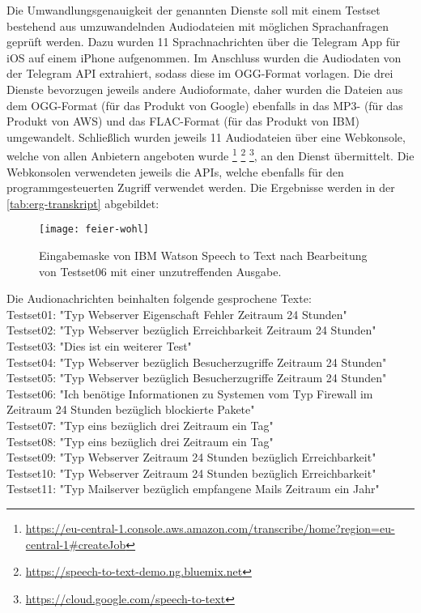 Die Umwandlungsgenauigkeit der genannten Dienste soll mit einem Testset bestehend aus umzuwandelnden Audiodateien mit möglichen Sprachanfragen geprüft werden. Dazu wurden 11 Sprachnachrichten über die Telegram App für iOS auf einem iPhone aufgenommen. Im Anschluss wurden die Audiodaten von der Telegram API extrahiert, sodass diese im OGG-Format vorlagen. Die drei Dienste bevorzugen jeweils andere Audioformate, daher wurden die Dateien aus dem OGG-Format (für das Produkt von Google) ebenfalls in das MP3- (für das Produkt von AWS) und das FLAC-Format (für das Produkt von IBM) umgewandelt. Schließlich wurden jeweils 11 Audiodateien über eine Webkonsole, welche von allen Anbietern angeboten wurde \footnote{\url{https://eu-central-1.console.aws.amazon.com/transcribe/home?region=eu-central-1\#createJob}} \footnote{\url{https://speech-to-text-demo.ng.bluemix.net}} \footnote{\url{https://cloud.google.com/speech-to-text}}, an den Dienst übermittelt. Die Webkonsolen verwendeten jeweils die APIs, welche ebenfalls für den programmgesteuerten Zugriff verwendet werden. Die Ergebnisse werden in der \autoref{tab:erg-transkript} abgebildet:

\begin{figure}[h!]
\centering
\texttt{[image: feier-wohl]}
\caption{Eingabemaske von IBM Watson Speech to Text nach Bearbeitung von Testset06 mit einer unzutreffenden Ausgabe.}
\label{fig:feier-wohl}
\end{figure}

Die Audionachrichten beinhalten folgende gesprochene Texte: \\
Testset01: "Typ Webserver Eigenschaft Fehler Zeitraum 24 Stunden" \\
Testset02: "Typ Webserver bezüglich Erreichbarkeit Zeitraum 24 Stunden" \\
Testset03: "Dies ist ein weiterer Test" \\
Testset04: "Typ Webserver bezüglich Besucherzugriffe Zeitraum 24 Stunden" \\
Testset05: "Typ Webserver bezüglich Besucherzugriffe Zeitraum 24 Stunden" \\
Testset06: "Ich benötige Informationen zu Systemen vom Typ Firewall im Zeitraum 24 Stunden bezüglich blockierte Pakete" \\
Testset07: "Typ eins bezüglich drei Zeitraum ein Tag" \\
Testset08: "Typ eins bezüglich drei Zeitraum ein Tag" \\
Testset09: "Typ Webserver Zeitraum 24 Stunden bezüglich Erreichbarkeit" \\
Testset10: "Typ Webserver Zeitraum 24 Stunden bezüglich Erreichbarkeit" \\
Testset11: "Typ Mailserver bezüglich empfangene Mails Zeitraum ein Jahr" \\


